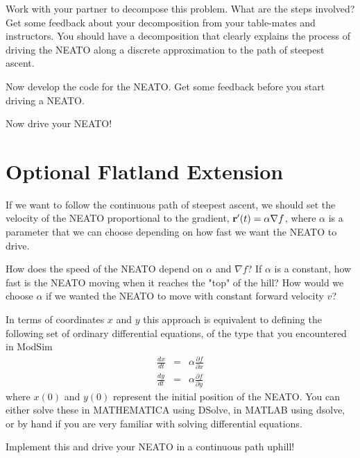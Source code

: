 \documentclass{tufte-handout}
\begin{document}
\be[resume]
\item Work with your partner to decompose this problem. What are the steps involved? Get some feedback about your decomposition from your table-mates and instructors. You should have a decomposition that clearly explains the process of driving the NEATO along a discrete approximation to the path of steepest ascent.
\item Now develop the code for the NEATO. Get some feedback before you start driving a NEATO.
\item Now drive your NEATO!
\ee

\section{Optional Flatland Extension}
If we want to follow the continuous path of steepest ascent, we should set the velocity of the NEATO proportional to the gradient, $\mathbf{r}'(t) = \alpha \nabla f$, where $\alpha$ is a parameter that we can choose depending on how fast we want the NEATO to drive.

\be[resume]
\item How does the speed of the NEATO depend on $\alpha$ and $\nabla f$? If $\alpha$ is a constant, how fast is the NEATO moving when it reaches the "top" of the hill? How would we choose $\alpha$ if we wanted the NEATO to move with constant forward velocity $v$?
\item In terms of coordinates $x$ and $y$ this approach is equivalent to defining the following set of ordinary differential equations, of the type that you encountered in ModSim
\begin{eqnarray*}
\frac{dx}{dt} &=& \alpha \frac{\partial f}{\partial x} \\
\frac{dy}{dt} &=& \alpha \frac{\partial f}{\partial y}
\end{eqnarray*}
where $x(0)$ and $y(0)$ represent the initial position of the NEATO. You can either solve these in MATHEMATICA using DSolve, in MATLAB using dsolve, or by hand if you are very familiar with solving differential equations.
\item Implement this and drive your NEATO in a continuous path uphill!
\ee

\end{document}
